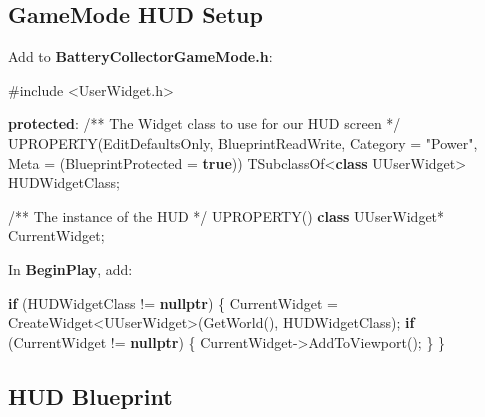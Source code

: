 \documentclass[
  letterpaper,
  DIV=11,
  numbers=noendperiod]{scrartcl}
\newenvironment{Shaded}{\begin{snugshade}}{\end{snugshade}}
\newcommand{\CommentTok}[1]{\textcolor[rgb]{0.37,0.37,0.37}{#1}}
\newcommand{\ControlFlowTok}[1]{\textcolor[rgb]{0.00,0.23,0.31}{\textbf{#1}}}
\newcommand{\ImportTok}[1]{\textcolor[rgb]{0.00,0.46,0.62}{#1}}
\newcommand{\KeywordTok}[1]{\textcolor[rgb]{0.00,0.23,0.31}{\textbf{#1}}}
\newcommand{\NormalTok}[1]{\textcolor[rgb]{0.00,0.23,0.31}{#1}}
\newcommand{\OperatorTok}[1]{\textcolor[rgb]{0.37,0.37,0.37}{#1}}
\newcommand{\PreprocessorTok}[1]{\textcolor[rgb]{0.68,0.00,0.00}{#1}}
\newcommand{\StringTok}[1]{\textcolor[rgb]{0.13,0.47,0.30}{#1}}
\begin{document}
\subsection{GameMode HUD Setup}\label{gamemode-hud-setup}

Add to \textbf{BatteryCollectorGameMode.h}:

\begin{Shaded}
\begin{Highlighting}[]
\PreprocessorTok{\#include }\ImportTok{\textless{}UserWidget.h\textgreater{}}

\KeywordTok{protected}\OperatorTok{:}
    \CommentTok{/** The Widget class to use for our HUD screen */}
\NormalTok{    UPROPERTY}\OperatorTok{(}\NormalTok{EditDefaultsOnly}\OperatorTok{,}\NormalTok{ BlueprintReadWrite}\OperatorTok{,}\NormalTok{ Category }\OperatorTok{=} \StringTok{"Power"}\OperatorTok{,}\NormalTok{ Meta }\OperatorTok{=} \OperatorTok{(}\NormalTok{BlueprintProtected }\OperatorTok{=} \KeywordTok{true}\OperatorTok{))}
\NormalTok{    TSubclassOf}\OperatorTok{\textless{}}\KeywordTok{class}\NormalTok{ UUserWidget}\OperatorTok{\textgreater{}}\NormalTok{ HUDWidgetClass}\OperatorTok{;}
    
    \CommentTok{/** The instance of the HUD */}
\NormalTok{    UPROPERTY}\OperatorTok{()}
    \KeywordTok{class}\NormalTok{ UUserWidget}\OperatorTok{*}\NormalTok{ CurrentWidget}\OperatorTok{;}
\end{Highlighting}
\end{Shaded}

In \textbf{BeginPlay}, add:

\begin{Shaded}
\begin{Highlighting}[]
\ControlFlowTok{if} \OperatorTok{(}\NormalTok{HUDWidgetClass }\OperatorTok{!=} \KeywordTok{nullptr}\OperatorTok{)}
\OperatorTok{\{}
\NormalTok{    CurrentWidget }\OperatorTok{=}\NormalTok{ CreateWidget}\OperatorTok{\textless{}}\NormalTok{UUserWidget}\OperatorTok{\textgreater{}(}\NormalTok{GetWorld}\OperatorTok{(),}\NormalTok{ HUDWidgetClass}\OperatorTok{);}
    \ControlFlowTok{if} \OperatorTok{(}\NormalTok{CurrentWidget }\OperatorTok{!=} \KeywordTok{nullptr}\OperatorTok{)}
    \OperatorTok{\{}
\NormalTok{        CurrentWidget}\OperatorTok{{-}\textgreater{}}\NormalTok{AddToViewport}\OperatorTok{();}
    \OperatorTok{\}}
\OperatorTok{\}}
\end{Highlighting}
\end{Shaded}

\subsection{HUD Blueprint}\label{hud-blueprint}
\end{document}
